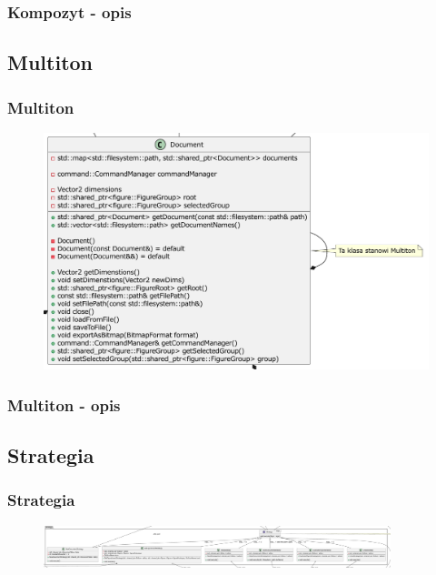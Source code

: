 \documentclass[
	11pt,]{beamer}
\begin{document}
\begin{frame}
	\frametitle{Kompozyt - opis}
	
\end{frame}

\subsection{Multiton}

\begin{frame}
	\frametitle{Multiton}
	
	\begin{figure}
		\includegraphics[height=0.7\textheight]{figures/multiton.pdf}
	\end{figure}
\end{frame}

\begin{frame}
	\frametitle{Multiton - opis}
	
\end{frame}

\subsection{Strategia}

\begin{frame}
	\frametitle{Strategia}
	
	\begin{figure}
		\includegraphics[width=0.9\textwidth]{figures/strategy.pdf}
	\end{figure}
\end{frame}
\end{document}
